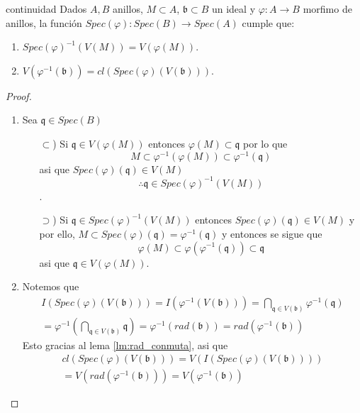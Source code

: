 \documentclass[14pt]{extarticle}
\begin{document}
\begin{proposicion}{}{continuidad}
    Dados $A, B$ anillos, $M\subset A$, $\mathfrak{b} \subset B$
    un ideal y $\varphi:A \rightarrow B$ morfimo de anillos,
    la función $Spec(\varphi):Spec(B)\rightarrow Spec(A)$
    cumple que:
    \begin{enumerate}
        \item $Spec(\varphi)^{-1}(V(M))=V(\varphi(M))$.
        \item $V(\varphi^{-1}(\mathfrak{b}))=cl(Spec(\varphi)(V(\mathfrak{b})))$.
    \end{enumerate}
\end{proposicion}
\begin{proof}
    \begin{enumerate}
        \item Sea $\mathfrak{q}\in Spec(B)$
        \begin{enumerate}
            \item[$\subset$)] Si $\mathfrak{q}\in V(\varphi(M))$
            entonces $\varphi(M)\subset \mathfrak{q}$ por lo que 
            $$M\subset \varphi^{-1}(\varphi(M))\subset \varphi^{-1}(\mathfrak{q})$$
            asi que $Spec(\varphi)(\mathfrak{q})\in V(M)$
            $$\therefore \mathfrak{q}\in Spec(\varphi)^{-1}(V(M))$$.
            \item[$\supset$)] Si $\mathfrak{q}\in Spec(\varphi)^{-1}(V(M))$
            entonces $Spec(\varphi)(\mathfrak{q})\in V(M)$ y por ello,
            $M \subset Spec(\varphi)(\mathfrak{q}) = \varphi^{-1}(\mathfrak{q})$
            y entonces se sigue que 
            $$\varphi(M)\subset \varphi(\varphi^{-1}(\mathfrak{q}))\subset \mathfrak{q}$$
            asi que $\mathfrak{q}\in V(\varphi(M))$.
        \end{enumerate}
        \item Notemos que
        \begin{multline*}
            I(Spec(\varphi)(V(\mathfrak{b})))
            = I(\varphi^{-1}(V(\mathfrak{b})))
            = \bigcap_{\mathfrak{q}\in V(\mathfrak{b})}\varphi^{-1}(\mathfrak{q})\\
            = \varphi^{-1}(\bigcap_{\mathfrak{q}\in V(\mathfrak{b})}\mathfrak{q})
            = \varphi^{-1}(rad(\mathfrak{b}))
            = rad(\varphi^{-1}(\mathfrak{b}))
        \end{multline*}
        Esto gracias al lema \ref{lm:rad_conmuta}, asi que 
        \begin{multline*}
            cl(Spec(\varphi)(V(\mathfrak{b})))
            =V(I(Spec(\varphi)(V(\mathfrak{b}))))\\
            =V(rad(\varphi^{-1}(\mathfrak{b})))
            =V(\varphi^{-1}(\mathfrak{b}))
        \end{multline*}

    \end{enumerate}
\end{proof}
\end{document}
